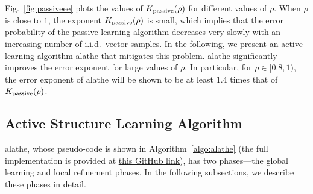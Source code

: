 \documentclass[11pt,onecolumn]{article}
\newcommand{\Passive}{{\rm passive}}
\begin{document}
Fig.~\ref{fig:passiveee} plots the values of $K _{\Passive}(\rho)$ for different values of $\rho$. When $\rho$ 
is close to $1$, the  exponent $K_{\Passive}(\rho)$ is small, which  implies that the error probability of the passive learning algorithm decreases very slowly with an increasing number of i.i.d.\ vector samples. In the following, we present an active learning algorithm \ac{alathe} that mitigates this problem.   \ac{alathe} significantly improves
the error exponent for large values of $\rho$. In particular, for $\rho\in[0.8,1)$, the error exponent of  \ac{alathe} will be shown to be at least $1.4$ times that of $K _{\Passive}(\rho)$.


\subsection{Active Structure Learning Algorithm}
 \ac{alathe}, whose pseudo-code is shown in Algorithm~\ref{algo:alathe} (the full implementation is provided at   \textcolor{blue}{\href{https://github.com/Zhang-Fengzhuo/Active-LATHE}{this    GitHub link}}), has two phases---the global learning  and  local refinement phases. In the following subsections, we describe these phases in detail.
\end{document}
